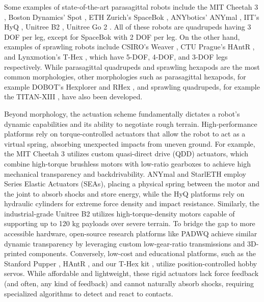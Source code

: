 Some examples of state-of-the-art parasagittal robots include the MIT Cheetah 3 \cite{bledtMITCheetah32018}, Boston Dynamics' Spot \cite{Spot}, ETH Zurich's SpaceBok \cite{armSpaceBokDynamicLegged2019}, ANYbotics' ANYmal \cite{hutterANYmalHighlyMobile2016}, IIT's HyQ \cite{seminiHyQDynamicLocomotion}, Unitree B2 \cite{UnitreeB2}, Unitree Go 2 \cite{UnitreeGo2}. All of these robots are quadrupeds having 3 DOF per leg, except for SpaceBok with 2 DOF per leg. On the other hand, examples of sprawling robots include CSIRO's Weaver \cite{bjelonicWeaverHexapodRobot2018}, CTU Prague's HAntR \cite{cizekDesignConstructionRoughTerrain2021}, and Lynxmotion's T-Hex \cite{THex3DoFHexapod}, which have 5-DOF, 4-DOF, and 3-DOF legs respectively. While parasagittal quadrupeds and sprawling hexapods are the most common morphologies, other morphologies such as parasagittal hexapods, for example DOBOT's Hexplorer \cite{DOBOTHEXAPODRobot} and RHex \cite{PDFRHexSimple}, and sprawling quadrupeds, for example the TITAN-XIII \cite{PDFTITANXIIISprawlingtype}, have also been developed.

Beyond morphology, the actuation scheme fundamentally dictates a robot's dynamic capabilities and its ability to negotiate rough terrain. High-performance platforms rely on torque-controlled actuators that allow the robot to act as a virtual spring, absorbing unexpected impacts from uneven ground. For example, the MIT Cheetah 3 \cite{bledtMITCheetah32018} utilizes custom quasi-direct drive (QDD) actuators, which combine high-torque brushless motors with low-ratio gearboxes to achieve high mechanical transparency and backdrivability. ANYmal \cite{hutterANYmalHighlyMobile2016} and StarlETH \cite{hutterSTARLETHCOMPLIANTQUADRUPEDAL2012} employ Series Elastic Actuators (SEAs), placing a physical spring between the motor and the joint to absorb shocks and store energy, while the HyQ platforms \cite{seminiHyQDynamicLocomotion} rely on hydraulic cylinders for extreme force density and impact resistance. Similarly, the industrial-grade Unitree B2 \cite{UnitreeB2} utilizes high-torque-density motors capable of supporting up to 120 kg payloads over severe terrain. To bridge the gap to more accessible hardware, open-source research platforms like PADWQ \cite{kimPADWQDesignControl2021} achieve similar dynamic transparency by leveraging custom low-gear-ratio transmissions and 3D-printed components. Conversely, low-cost and educational platforms, such as the Stanford Pupper \cite{YerbertDingoQuadrupedBase}, HAntR \cite{cizekDesignConstructionRoughTerrain2021}, and our T-Hex kit \cite{THex3DoFHexapod}, utilize position-controlled hobby servos. While affordable and lightweight, these rigid actuators lack force feedback (and often, any kind of feedback) and cannot naturally absorb shocks, requiring specialized algorithms to detect and react to contacts.

